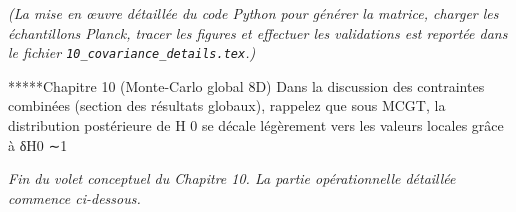 \noindent\emph{(La mise en œuvre détaillée du code Python pour générer la matrice, charger les échantillons Planck, tracer les figures et effectuer les validations est reportée dans le fichier \texttt{10\_covariance\_details.tex}.)}

*****Chapitre 10 (Monte-Carlo global 8D)
Dans la discussion des contraintes combinées (section des résultats globaux), rappelez que sous MCGT, la distribution postérieure de H 0 se décale légèrement vers les valeurs locales grâce à δH0 ∼1%

\noindent\emph{Fin du volet conceptuel du Chapitre 10. La partie opérationnelle détaillée commence ci-dessous.}
